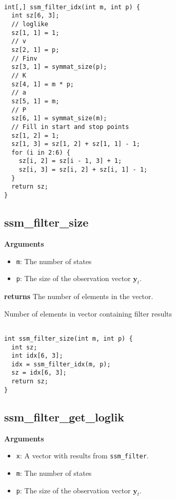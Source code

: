 \documentclass[]{book}
\providecommand{\tightlist}{%
  \setlength{\itemsep}{0pt}\setlength{\parskip}{0pt}}
\renewcommand{\vec}[1]{\boldsymbol{#1}}
\begin{document}
\begin{verbatim}

int[,] ssm_filter_idx(int m, int p) {
  int sz[6, 3];
  // loglike
  sz[1, 1] = 1;
  // v
  sz[2, 1] = p;
  // Finv
  sz[3, 1] = symmat_size(p);
  // K
  sz[4, 1] = m * p;
  // a
  sz[5, 1] = m;
  // P
  sz[6, 1] = symmat_size(m);
  // Fill in start and stop points
  sz[1, 2] = 1;
  sz[1, 3] = sz[1, 2] + sz[1, 1] - 1;
  for (i in 2:6) {
    sz[i, 2] = sz[i - 1, 3] + 1;
    sz[i, 3] = sz[i, 2] + sz[i, 1] - 1;
  }
  return sz;
}

\end{verbatim}

\subsection{ssm\_filter\_size}\label{ssm_filter_size}

\textbf{Arguments}

\begin{itemize}
\tightlist
\item
  \texttt{m}: The number of states
\item
  \texttt{p}: The size of the observation vector \(\vec{y}_t\).
\end{itemize}

\textbf{returns} The number of elements in the vector.

Number of elements in vector containing filter results

\begin{verbatim}

int ssm_filter_size(int m, int p) {
  int sz;
  int idx[6, 3];
  idx = ssm_filter_idx(m, p);
  sz = idx[6, 3];
  return sz;
}

\end{verbatim}

\subsection{ssm\_filter\_get\_loglik}\label{ssm_filter_get_loglik}

\textbf{Arguments}

\begin{itemize}
\tightlist
\item
  \texttt{x}: A vector with results from \texttt{ssm\_filter}.
\item
  \texttt{m}: The number of states
\item
  \texttt{p}: The size of the observation vector \(\vec{y}_t\).
\end{itemize}
\end{document}
